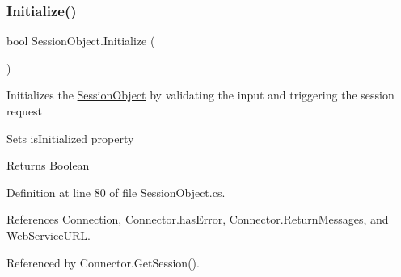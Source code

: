 \subsubsection{\texorpdfstring{Initialize()}{Initialize()}}
{\footnotesize\ttfamily bool Session\+Object.\+Initialize (\begin{DoxyParamCaption}{ }\end{DoxyParamCaption})}



Initializes the \mbox{\hyperlink{class_session_object}{Session\+Object}} by validating the input and triggering the session request 

Sets is\+Initialized property

\begin{DoxyReturn}{Returns}
Boolean
\end{DoxyReturn}


Definition at line 80 of file Session\+Object.\+cs.



References Connection, Connector.\+has\+Error, Connector.\+Return\+Messages, and Web\+Service\+U\+RL.



Referenced by Connector.\+Get\+Session().


